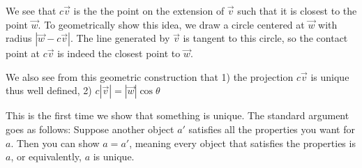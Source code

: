 We see that $c\vec{v}$ is the the point on the extension of $\vec{v}$ such that it is closest to the point $\vec{w}$. To geometrically show this idea, we draw a circle centered at $\vec{w}$ with radius $|\vec{w}-c\vec{v}|$. The line generated by $\vec{v}$ is tangent to this circle, so the contact point at $c\vec{v}$ is indeed the closest point to $\vec{w}$. 
\usetikzlibrary{angles} 
\begin{figure}[h]
	\centering
	\begin{subfigure}{0.4\textwidth}
		\centering
	\end{subfigure}
	\begin{subfigure}{0.4\textwidth}
	\end{subfigure}
\end{figure}
	
	
	

We also see from this geometric construction that 1) the projection $c\vec{v}$ is unique thus well defined, 2) $c|\vec{v}|=|\vec{w}|\cos \theta$

This is the first time we show that something is unique. The standard argument goes as follows: Suppose another object $a'$ satisfies all the properties you want for $a$. Then you can show $a=a'$, meaning every object that satisfies the properties is $a$, or equivalently, $a$ is unique. 

